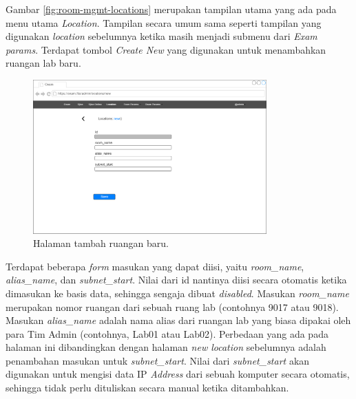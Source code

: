 \documentclass[a4paper,twoside]{article}
\begin{document}
\begin{enumerate}
\begin{itemize}
\begin{itemize}
                Gambar \ref{fig:room-mgmt-locations} merupakan tampilan utama yang ada pada menu utama \textit{Location}. Tampilan secara umum sama seperti tampilan yang digunakan \textit{location} sebelumnya ketika masih menjadi submenu dari \textit{Exam params}.  Terdapat tombol \textit{Create New} yang digunakan untuk menambahkan ruangan lab baru. 
                
                 \begin{figure}[H]
                    \centering
                    \includegraphics[width=0.8\textwidth]{images/ui designs/room-management/new-locations.png}
                    \caption{Halaman tambah ruangan baru.}
                    \label{fig:room-mgmt-new-locations}
                \end{figure}
                
                Terdapat beberapa \textit{form} masukan yang dapat diisi, yaitu \textit{room\_name}, \textit{alias\_name}, dan \textit{subnet\_start}. Nilai dari id nantinya diisi secara otomatis ketika dimasukan ke basis data, sehingga sengaja dibuat \textit{disabled}. Masukan \textit{room\_name} merupakan nomor ruangan dari sebuah ruang lab (contohnya 9017 atau 9018). Masukan \textit{alias\_name} adalah nama alias dari ruangan lab yang biasa dipakai oleh para Tim Admin (contohnya, Lab01 atau Lab02). Perbedaan yang ada pada halaman ini dibandingkan dengan halaman \textit{new location} sebelumnya adalah penambahan masukan untuk \textit{subnet\_start}. Nilai dari \textit{subnet\_start} akan digunakan untuk mengisi data IP \textit{Address} dari sebuah komputer secara otomatis, sehingga tidak perlu dituliskan secara manual ketika ditambahkan.
                
                

\end{itemize}
\end{itemize}
\end{enumerate}
\end{document}
